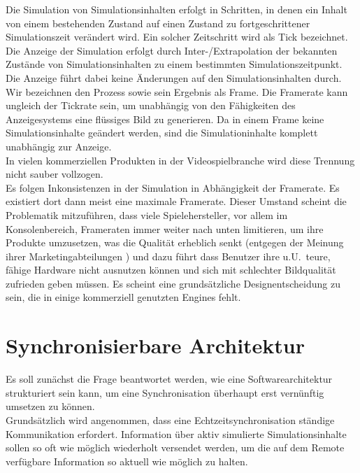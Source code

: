 \documentclass[11pt,twoside,a4paper]{article}
\begin{document}
Die Simulation von Simulationsinhalten erfolgt in Schritten, in denen ein Inhalt von einem bestehenden Zustand auf einen Zustand zu fortgeschrittener Simulationszeit verändert wird. Ein solcher Zeitschritt wird als Tick bezeichnet.\\
Die Anzeige der Simulation erfolgt durch Inter-/Extrapolation der bekannten Zustände von Simulationsinhalten zu einem bestimmten Simulationszeitpunkt. Die Anzeige führt dabei keine Änderungen auf den Simulationsinhalten durch. Wir bezeichnen den Prozess sowie sein Ergebnis als Frame.
Die Framerate kann ungleich der Tickrate sein, um unabhängig von den Fähigkeiten des Anzeigesystems eine flüssiges Bild zu generieren. Da in einem Frame keine Simulationsinhalte geändert werden, sind die Simulationinhalte komplett unabhängig zur Anzeige.\\

In vielen kommerziellen Produkten in der Videospielbranche wird diese Trennung nicht sauber vollzogen.\\
Es folgen Inkonsistenzen in der Simulation in Abhängigkeit der Framerate.
Es existiert dort dann meist eine maximale Framerate.
Dieser Umstand scheint die Problematik mitzuführen, dass viele Spielehersteller, vor allem im Konsolenbereich, Frameraten immer weiter nach unten limitieren, um ihre Produkte umzusetzen, was die Qualität erheblich senkt 
(entgegen der Meinung ihrer Marketingabteilungen
) und dazu führt dass Benutzer ihre u.U.~teure, fähige Hardware nicht ausnutzen können und sich mit schlechter Bildqualität zufrieden geben müssen.
Es scheint eine grundsätzliche Designentscheidung zu sein, die in einige kommerziell genutzten Engines fehlt.


\section{Synchronisierbare Architektur}
Es soll zunächst die Frage beantwortet werden, wie eine Softwarearchitektur strukturiert sein kann, um eine Synchronisation überhaupt erst vernünftig umsetzen zu können.\\
Grundsätzlich wird angenommen, dass eine Echtzeitsynchronisation ständige Kommunikation erfordert.
Information über aktiv simulierte Simulationsinhalte sollen so oft wie möglich wiederholt versendet werden, um die auf dem Remote verfügbare Information so aktuell wie möglich zu halten.
\end{document}
